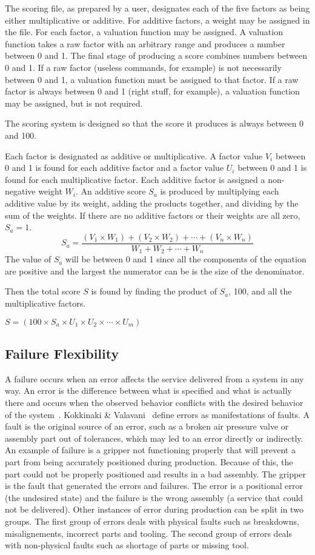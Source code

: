 The scoring file, as prepared by a user, designates each of the five
factors as being either multiplicative or additive. For additive factors, a
weight may be assigned in the file. For each factor, a valuation function
may be assigned. A valuation function takes a raw factor with an arbitrary
range and produces a number between 0 and 1. The final stage of producing
a score combines numbers between 0 and 1. If a raw factor (useless
commands, for example) is not necessarily between 0 and 1, a valuation
function must be assigned to that factor. If a raw factor is always between
0 and 1 (right stuff, for example), a valuation function may be assigned,
but is not required.

The scoring system is designed so that the score it produces is always
between 0 and 100.

Each factor is designated as additive or multiplicative. A factor
value $V_i$ between 0 and 1 is found for each additive factor and a
factor value $U_i$ between 0 and 1 is found for each multiplicative
factor. Each additive factor is assigned a non-negative weight $W_i$. An
additive score $S_a$ is produced by multiplying each additive value by
its weight, adding the products together, and dividing by the sum of the
weights. If there are no additive factors or their weights are all
zero, $S_a = 1$.
\[
S_a = \frac{(V_1\times W_1)+(V_2\times W_2)+\cdots + (V_n\times W_n)}{W_1+W_2+\cdots+W_n}
\]
The value of $S_a$ will be between 0 and 1 since all the components of the
equation are positive and the largest the numerator can be is the size
of the denominator.

Then the total score $S$ is found by finding the product of $S_a$, 100, and
all the multiplicative factors.

$S = (100\times S_a\times U_1\times U_2\times\cdots \times U_m)$

\subsection{Failure Flexibility}
A failure occurs when an error affects the service delivered from a system in any way. An error is the difference between what is specified and what is actually there and occurs when the observed behavior conflicts with the desired behavior of the system~\cite{Odrey.1995}. Kokkinaki \& Valavani~\cite{Kokkinaki.1996} define errors as manifestations of faults. A fault is the original source of an error, such as a broken air pressure valve or assembly part out of tolerances, which may led to an error directly or indirectly.
An example of failure is a gripper not functioning properly that will prevent a part from being accurately positioned during production. Because of this, the part could not be properly positioned and results in a bad assembly. The gripper is the fault that generated the errors and failures. The error is a positional error (the undesired state) and the failure is the wrong assembly (a service that could not be delivered). Other instances of error during production can be split in two groups. The first group of errors deals with physical faults such as breakdowns, misalignements, incorrect parts and tooling. The second group of errors deals with non-physical faults such as shortage of parts or missing  tool.

